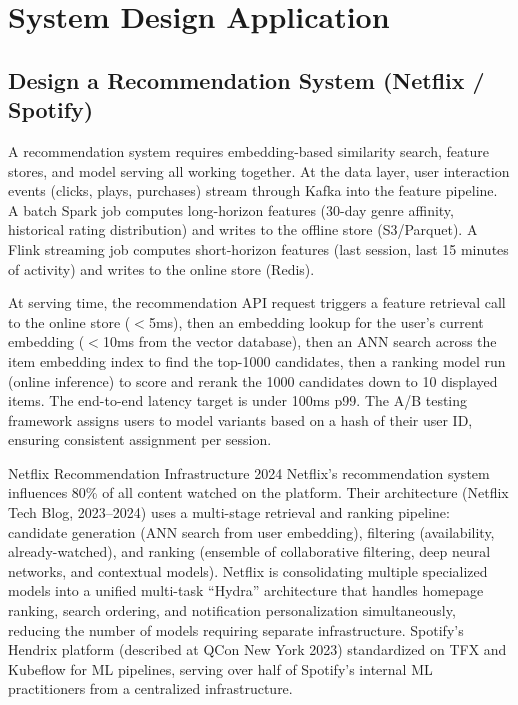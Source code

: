 \documentclass[11pt,a4paper]{article}
\begin{document}
\section{System Design Application}

\subsection{Design a Recommendation System (Netflix / Spotify)}

A recommendation system requires embedding-based similarity search, feature stores, and model serving all working together. At the data layer, user interaction events (clicks, plays, purchases) stream through Kafka into the feature pipeline. A batch Spark job computes long-horizon features (30-day genre affinity, historical rating distribution) and writes to the offline store (S3/Parquet). A Flink streaming job computes short-horizon features (last session, last 15 minutes of activity) and writes to the online store (Redis).

At serving time, the recommendation API request triggers a feature retrieval call to the online store ($<$5ms), then an embedding lookup for the user's current embedding ($<$10ms from the vector database), then an ANN search across the item embedding index to find the top-1000 candidates, then a ranking model run (online inference) to score and rerank the 1000 candidates down to 10 displayed items. The end-to-end latency target is under 100ms p99. The A/B testing framework assigns users to model variants based on a hash of their user ID, ensuring consistent assignment per session.

\begin{industrybox}{Netflix Recommendation Infrastructure 2024}
Netflix's recommendation system influences 80\% of all content watched on the platform. Their architecture (Netflix Tech Blog, 2023--2024) uses a multi-stage retrieval and ranking pipeline: candidate generation (ANN search from user embedding), filtering (availability, already-watched), and ranking (ensemble of collaborative filtering, deep neural networks, and contextual models). Netflix is consolidating multiple specialized models into a unified multi-task ``Hydra'' architecture that handles homepage ranking, search ordering, and notification personalization simultaneously, reducing the number of models requiring separate infrastructure. Spotify's Hendrix platform (described at QCon New York 2023) standardized on TFX and Kubeflow for ML pipelines, serving over half of Spotify's internal ML practitioners from a centralized infrastructure.
\end{industrybox}
\end{document}
